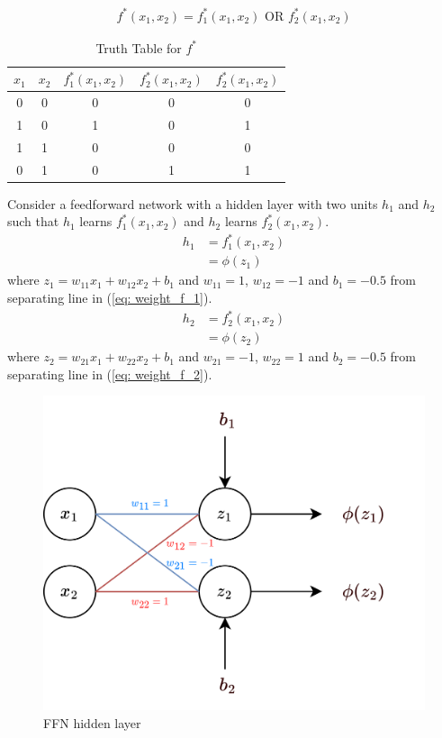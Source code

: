 \begin{align}
  \nonumber
  f^*(x_1,x_2) = f_1^*(x_1,x_2) \text{ OR } f_2^*(x_1,x_2)
\end{align}
\begin{table}[H]
  \begin{center}
    \begin{tabular}{ c c c c c}
      $x_1$ & $x_2$ & $f_1^*(x_1,x_2)$ & $f_2^*(x_1,x_2)$ &$f_2^*(x_1,x_2)$ \\
     \hline 
      0 & 0 & 0 & 0 & 0\\  
      1 & 0 & 1 & 0 & 1\\  
      1 & 1 & 0 & 0 & 0\\  
      0 & 1 & 0 & 1 & 1
    \end{tabular}
    \caption{Truth Table for $f^{*}$}
  \label{table:truth_table_f*}
  \end{center}  
\end{table}
\noindent Consider a feedforward network with a hidden layer with two units $h_1$ and $h_2$ such that $h_1$ learns $f_1^*(x_1,x_2)$ and $h_2$ learns $f_2^*(x_1,x_2)$.
\begin{align}
  h_1 &= f_1^*(x_1,x_2) \nonumber\\
  &= \phi(z_1) \nonumber
\end{align}
where $z_1 = w_{11}x_1 + w_{12}x_2 + b_1$ and $w_{11} = 1$, $w_{12} = -1$ and $b_1=-0.5$ from separating line in (\ref{eq: weight_f_1}).
\begin{align}
  h_2 &= f_2^*(x_1,x_2) \nonumber\\
  &= \phi(z_2) \nonumber
\end{align}
where $z_2 = w_{21}x_1 + w_{22}x_2 + b_1$ and $w_{21} = -1$, $w_{22} = 1$ and $b_2 = -0.5$ from separating line in (\ref{eq: weight_f_2}).
\begin{figure}[ht]
  \centering
  \includegraphics[scale=1.5]{CHAPTER_2/c2_fig_hidden_layer_draw.png}
  \caption{FFN hidden layer}
  \label{fig:hidden_layer_only}
\end{figure} \\
